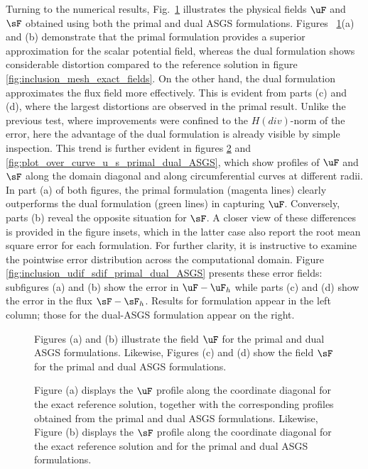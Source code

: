 Turning to the numerical results, Fig.~\ref{fig:inclusion_u_s_primal_dual_ASGS} illustrates
the physical fields $\uF$ and $\sF$ obtained using both the primal and dual ASGS formulations.
Figures ~\ref{fig:inclusion_u_s_primal_dual_ASGS}(a) and (b) demonstrate that the primal
formulation provides a superior approximation for the scalar potential field, whereas the dual 
formulation shows considerable distortion compared to the reference solution in figure 
\ref{fig:inclusion_mesh_exact_fields}. On the other hand, the dual formulation approximates the 
flux field more effectively. This is evident from parts (c) and (d), where the largest distortions 
are observed in the primal result. Unlike the previous test, where improvements were confined to 
the $H(div)$-norm of the error, here the advantage of the dual formulation is already visible by 
simple inspection. This trend is further evident in figures
\ref{fig:plot_over_line_u_s_primal_dual_ASGS} and \ref{fig:plot_over_curve_u_s_primal_dual_ASGS}, 
which show profiles of $\uF$ and $\sF$ along the domain diagonal and along circumferential curves 
at different radii. In
part (a) of both figures, the primal formulation (magenta lines) clearly outperforms the
dual formulation (green lines) in capturing $\uF$. Conversely, parts (b) reveal 
the opposite situation for $\sF$. A closer view of these differences is provided in the figure
insets, which in the latter case also report the root mean square error for each formulation. 
For further clarity, it is instructive to examine the pointwise error distribution across the
computational domain. Figure \ref{fig:inclusion_udif_sdif_primal_dual_ASGS} presents these error
fields: subfigures (a) and (b) show the error in $\uF - \uF_h$ while parts (c) and (d) show the
error in the flux $\sF - \sF_h$. Results for formulation appear in the left column; those for the
dual-ASGS formulation appear on the right.
\begin{figure}[ht!!]
	\centering
	\caption{Figures (a) and (b) illustrate the field $\uF$ for the primal and dual ASGS formulations. Likewise, Figures (c) and (d) show the field $\sF$ for the primal and dual ASGS formulations.}
	\fontsize{12pt}{10pt}\selectfont 
	\def\svgwidth{1.0\columnwidth}
	
	\label{fig:inclusion_u_s_primal_dual_ASGS}
\end{figure}

\begin{figure}[ht!!]
	\centering
	\caption{Figure (a) displays the $\uF$ profile along the coordinate diagonal for the exact reference solution, together with the corresponding profiles obtained from the primal and dual ASGS formulations. Likewise, Figure (b) displays the $\sF$ profile along the coordinate diagonal for the exact reference solution and for the primal and dual ASGS formulations.}
	\fontsize{12pt}{10pt}\selectfont 
	\def\svgwidth{0.8\columnwidth}
	
	\label{fig:plot_over_line_u_s_primal_dual_ASGS}
\end{figure}

